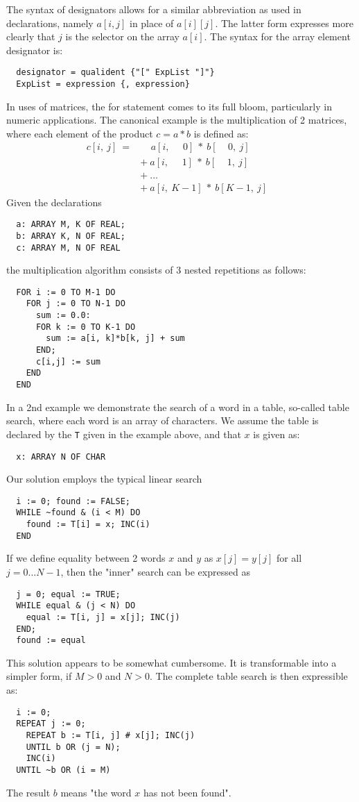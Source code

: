 The syntax of designators allows for a similar abbreviation as used in declarations,
namely $a[i, j]$ in place of $a[i][j]$. The latter form expresses more clearly that $j$
is the selector on the array $a[i]$. The syntax for the array element designator is:
\begin{verbatim}
  designator = qualident {"[" ExpList "]"}
  ExpList = expression {, expression}
\end{verbatim}
In uses of matrices, the for statement comes to its full bloom, particularly in numeric
applications.  The canonical example is the multiplication of 2 matrices, where each element
of the product $c = a*b$ is defined as:
\begin{align*}
  c[i,~j]~=&~~~~~a[i, ~~~~~~0]~*~b[ ~~~~~0,~j]& \\
              &+~a[i, ~~~~~~1]~*~b[ ~~~~~1,~j]& \\
              &+~...                          & \\
              &+~a[i,~K\!-\!1]~*~b[K\!-\!1,~j]&
\end{align*}
Given the declarations
\begin{verbatim}
  a: ARRAY M, K OF REAL;
  b: ARRAY K, N OF REAL;
  c: ARRAY M, N OF REAL
\end{verbatim}
the multiplication algorithm consists of 3 nested repetitions as follows:
\begin{verbatim}
  FOR i := 0 TO M-1 DO
    FOR j := 0 TO N-1 DO
      sum := 0.0:
      FOR k := 0 TO K-1 DO
        sum := a[i, k]*b[k, j] + sum
      END;
      c[i,j] := sum
    END
  END
\end{verbatim}
In a 2nd example we demonstrate the search of a word in a table, so-called table search,
where each word is an array of characters. We assume the table is declared by the \verb|T|
given in the example above, and that $x$ is given as:
\begin{verbatim}
  x: ARRAY N OF CHAR
\end{verbatim}
Our solution employs the typical linear search
\begin{verbatim}
  i := 0; found := FALSE;
  WHILE ~found & (i < M) DO
    found := T[i] = x; INC(i)
  END
\end{verbatim}
If we define equality between 2 words $x$ and $y$ as $x[j] = y[j]$ for all $j = 0\dots N-1$,
then the "inner" search can be expressed as
\begin{verbatim}
  j = 0; equal := TRUE;
  WHILE equal & (j < N) DO
    equal := T[i, j] = x[j]; INC(j)
  END;
  found := equal
\end{verbatim}
This solution appears to be somewhat cumbersome. It is transformable into a simpler form,
if $M > 0$ and $N > 0$. The complete table search is then expressible as:
\begin{verbatim}
  i := 0;
  REPEAT j := 0;
    REPEAT b := T[i, j] # x[j]; INC(j)
    UNTIL b OR (j = N);
    INC(i)
  UNTIL ~b OR (i = M)
\end{verbatim}
The result $b$ means "the word $x$ has not been found".

